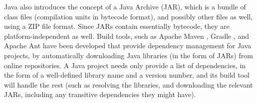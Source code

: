 Java also introduces the concept of a Java Archive (JAR), which is a
bundle of class files (compilation units in bytecode format), and
possibly other files as well, using a ZIP file format. Since JARs
contain essentially bytecode, they are platform-independent as
well. Build tools, such as Apache Maven \cite{www:maven}, Gradle
\cite{www:gradle}, and Apache Ant \cite{www:ant} have been developed
that provide dependency management for Java projects, by automatically
downloading Java libraries (in the form of JARs) from online
repositories. A Java project needs only provide a list of
dependencies, in the form of a well-defined library name and a version
number, and its build tool will handle the rest (such as resolving the
libraries, and downloading the relevant JARs, including any transitive
dependencies they might have).


